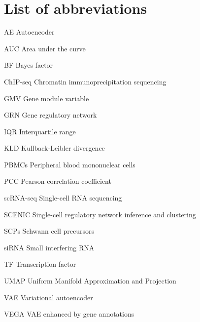 \documentclass{report}
\begin{document}
\tableofcontents

\chapter*{List of abbreviations}
\begin{abbrv}
	\item[AE]	Autoencoder
	\item[AUC]	Area under the curve
	\item[BF]	Bayes factor
	\item[ChIP-seq]	Chromatin immunoprecipitation sequencing
	\item[GMV]	Gene module variable
	\item[GRN]	Gene regulatory network
	\item[IQR]	Interquartile range
	\item[KLD]	Kullback-Leibler divergence
	\item[PBMCs]	Peripheral blood mononuclear cells
	\item[PCC]	Pearson correlation coefficient
	\item[scRNA-seq]	Single-cell RNA sequencing
	\item[SCENIC]	Single-cell regulatory network inference and clustering
	\item[SCPs]	Schwann cell precursors
	\item[siRNA]	Small interfering RNA
	\item[TF]	Transcription factor
	\item[UMAP]	Uniform Manifold Approximation and Projection
	\item[VAE]	Variational autoencoder
	\item[VEGA]	VAE enhanced by gene annotations
\end{abbrv}










\appendix

\begin{singlespace}
	
\end{singlespace}

\begin{singlespace}
	
	\nocite{*}
	
\end{singlespace}
\end{document}
